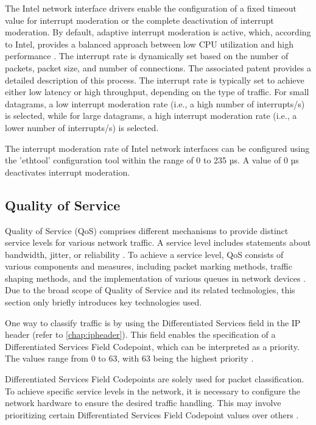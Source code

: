 The Intel network interface drivers enable the configuration of a fixed timeout value for interrupt moderation or the complete deactivation of interrupt moderation. By default, adaptive interrupt moderation is active, which, according to Intel, provides a balanced approach between low CPU utilization and high performance \cite{intermod03}. The interrupt rate is dynamically set based on the number of packets, packet size, and number of connections. The associated patent \cite{intermod04} provides a detailed description of this process. The interrupt rate is typically set to achieve either low latency or high throughput, depending on the type of traffic. For small datagrams, a low interrupt moderation rate (i.e., a high number of interrupts/s) is selected, while for large datagrams, a high interrupt moderation rate (i.e., a lower number of interrupts/s) is selected.

The interrupt moderation rate of Intel network interfaces can be configured using the 'ethtool' configuration tool within the range of 0 to 235 µs. A value of 0 µs deactivates interrupt moderation.

\subsection{Quality of Service} \label{background:tuning:qualityofservice}
Quality of Service (QoS) comprises different mechanisms to provide distinct service levels for various network traffic. A service level includes statements about bandwidth, jitter, or reliability \cite{qos01}. To achieve a service level, QoS consists of various components and measures, including packet marking methods, traffic shaping methods, and the implementation of various queues in network devices \cite{qos02}. Due to the broad scope of Quality of Service and its related technologies, this section only briefly introduces key technologies used.

One way to classify traffic is by using the Differentiated Services field in the IP header (refer to \ref{chap:ipheader}). This field enables the specification of a Differentiated Services Field Codepoint, which can be interpreted as a priority. The values range from 0 to 63, with 63 being the highest priority \cite{qos02}.

Differentiated Services Field Codepoints are solely used for packet classification. To achieve specific service levels in the network, it is necessary to configure the network hardware to ensure the desired traffic handling. This may involve prioritizing certain Differentiated Services Field Codepoint values over others \cite{qos02}.

